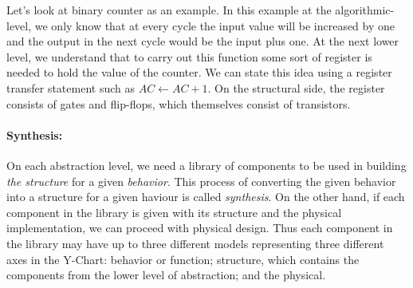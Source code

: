 Let's look at binary counter as an example. In this example at the algorithmic-level, we only know that at every cycle the input value will be increased by one and the output in the next cycle would be the input plus one.
At the next lower level, we understand that to carry out this function some sort of register is needed to hold the value of the counter.
We can state this idea using a register transfer statement such as $AC \leftarrow AC + 1$.
On the structural side, the register consists of gates and flip-flops, which themselves consist of transistors.

\paragraph{Synthesis:}On each abstraction level, we need a library of components to be used in building \emph{the structure} for a given \emph{behavior}.
This process of converting the given behavior into a structure for a given haviour is called \emph{synthesis}.
On the other hand, if each component in the library is given with its structure and
the physical implementation, we can proceed with physical design.
Thus each component in the library may have up to three different models representing
three different axes in the Y-Chart: behavior or function; structure, which
contains the components from the lower level of abstraction; and the physical.





